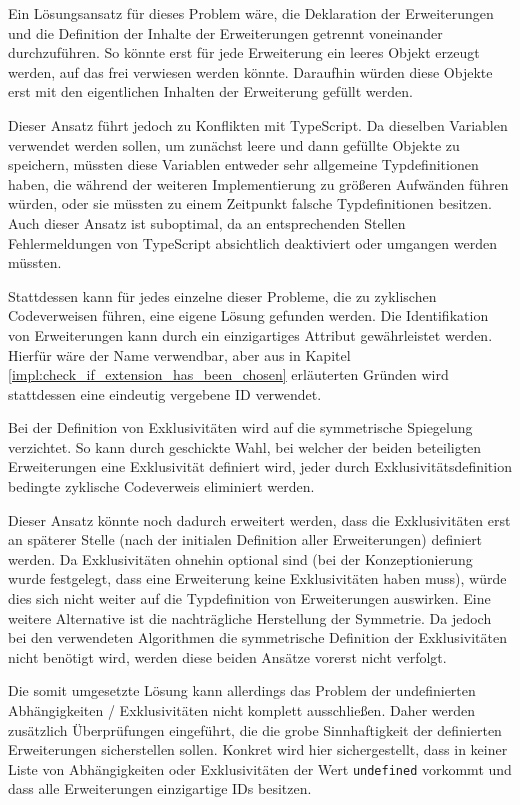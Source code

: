 Ein Lösungsansatz für dieses Problem wäre, die Deklaration der Erweiterungen und die Definition der Inhalte der Erweiterungen getrennt voneinander durchzuführen. So könnte erst für jede Erweiterung ein leeres Objekt erzeugt werden, auf das frei verwiesen werden könnte. Daraufhin würden diese Objekte erst mit den eigentlichen Inhalten der Erweiterung gefüllt werden.

Dieser Ansatz führt jedoch zu Konflikten mit TypeScript. Da dieselben Variablen verwendet werden sollen, um zunächst leere und dann gefüllte Objekte zu speichern, müssten diese Variablen entweder sehr allgemeine Typdefinitionen haben, die während der weiteren Implementierung zu größeren Aufwänden führen würden, oder sie müssten zu einem Zeitpunkt falsche Typdefinitionen besitzen. Auch dieser Ansatz ist suboptimal, da an entsprechenden Stellen Fehlermeldungen von TypeScript absichtlich deaktiviert oder umgangen werden müssten.

Stattdessen kann für jedes einzelne dieser Probleme, die zu zyklischen Codeverweisen führen, eine eigene Lösung gefunden werden. Die Identifikation von Erweiterungen kann durch ein einzigartiges Attribut gewährleistet werden. Hierfür wäre der Name verwendbar, aber aus in Kapitel \ref{impl:check_if_extension_has_been_chosen} erläuterten Gründen wird stattdessen eine eindeutig vergebene ID verwendet.

Bei der Definition von Exklusivitäten wird auf die symmetrische Spiegelung verzichtet. So kann durch geschickte Wahl, bei welcher der beiden beteiligten Erweiterungen eine Exklusivität definiert wird, jeder durch Exklusivitätsdefinition bedingte zyklische Codeverweis eliminiert werden.

Dieser Ansatz könnte noch dadurch erweitert werden, dass die Exklusivitäten erst an späterer Stelle (nach der initialen Definition aller Erweiterungen) definiert werden. Da Exklusivitäten ohnehin optional sind (bei der Konzeptionierung wurde festgelegt, dass eine Erweiterung keine Exklusivitäten haben muss), würde dies sich nicht weiter auf die Typdefinition von Erweiterungen auswirken. Eine weitere Alternative ist die nachträgliche Herstellung der Symmetrie. Da jedoch bei den verwendeten Algorithmen die symmetrische Definition der Exklusivitäten nicht benötigt wird, werden diese beiden Ansätze vorerst nicht verfolgt.

Die somit umgesetzte Lösung kann allerdings das Problem der undefinierten Abhängigkeiten / Exklusivitäten nicht komplett ausschließen. Daher werden zusätzlich Überprüfungen eingeführt, die die grobe Sinnhaftigkeit der definierten Erweiterungen sicherstellen sollen. Konkret wird hier sichergestellt, dass in keiner Liste von Abhängigkeiten oder Exklusivitäten der Wert \verb|undefined| vorkommt und dass alle Erweiterungen einzigartige IDs besitzen.

